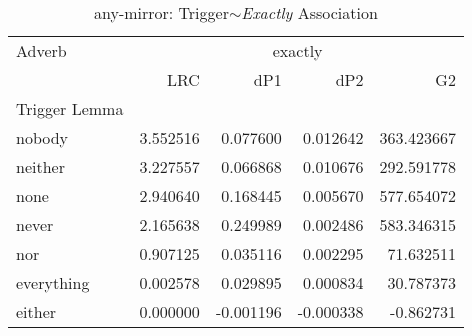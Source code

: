 
\begin{table}[ht]
\caption{any-mirror: Trigger$\sim$\textit{Exactly} Association}
\label{trigger-exactly-AM}
\begin{tabular}{lrrrr}
\toprule
Adverb & \multicolumn{4}{|c|}{exactly} \\
 & LRC & dP1 & dP2 & G2 \\
Trigger Lemma &  &  &  &  \\
\midrule
nobody & {\cellcolor[HTML]{67001F}} \color[HTML]{F1F1F1} 3.552516 & {\cellcolor[HTML]{FDDCC9}} \color[HTML]{000000} 0.077600 & {\cellcolor[HTML]{67001F}} \color[HTML]{F1F1F1} 0.012642 & {\cellcolor[HTML]{DF765E}} \color[HTML]{F1F1F1} 363.423667 \\
neither & {\cellcolor[HTML]{8D0C25}} \color[HTML]{F1F1F1} 3.227557 & {\cellcolor[HTML]{FBE3D4}} \color[HTML]{000000} 0.066868 & {\cellcolor[HTML]{C2383A}} \color[HTML]{F1F1F1} 0.010676 & {\cellcolor[HTML]{F5A886}} \color[HTML]{000000} 292.591778 \\
none & {\cellcolor[HTML]{AE172A}} \color[HTML]{F1F1F1} 2.940640 & {\cellcolor[HTML]{D25849}} \color[HTML]{F1F1F1} 0.168445 & {\cellcolor[HTML]{EFF3F5}} \color[HTML]{000000} 0.005670 & {\cellcolor[HTML]{6A011F}} \color[HTML]{F1F1F1} 577.654072 \\
never & {\cellcolor[HTML]{DB6B55}} \color[HTML]{F1F1F1} 2.165638 & {\cellcolor[HTML]{67001F}} \color[HTML]{F1F1F1} 0.249989 & {\cellcolor[HTML]{62A7CE}} \color[HTML]{F1F1F1} 0.002486 & {\cellcolor[HTML]{67001F}} \color[HTML]{F1F1F1} 583.346315 \\
nor & {\cellcolor[HTML]{FCDFCF}} \color[HTML]{000000} 0.907125 & {\cellcolor[HTML]{F6F7F7}} \color[HTML]{000000} 0.035116 & {\cellcolor[HTML]{569FC9}} \color[HTML]{F1F1F1} 0.002295 & {\cellcolor[HTML]{E7F0F4}} \color[HTML]{000000} 71.632511 \\
everything & {\cellcolor[HTML]{E1EDF3}} \color[HTML]{000000} 0.002578 & {\cellcolor[HTML]{F2F5F6}} \color[HTML]{000000} 0.029895 & {\cellcolor[HTML]{266CAF}} \color[HTML]{F1F1F1} 0.000834 & {\cellcolor[HTML]{D7E8F1}} \color[HTML]{000000} 30.787373 \\
either & {\cellcolor[HTML]{E1EDF3}} \color[HTML]{000000} 0.000000 & {\cellcolor[HTML]{D5E7F1}} \color[HTML]{000000} -0.001196 & {\cellcolor[HTML]{0D3F76}} \color[HTML]{F1F1F1} -0.000338 & {\cellcolor[HTML]{C5DFEC}} \color[HTML]{000000} -0.862731 \\

\end{tabular}
\end{table}
